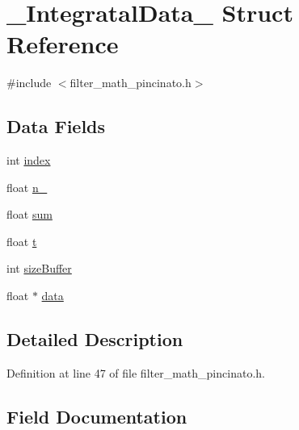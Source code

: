 \hypertarget{struct___integratal_data__}{}\section{\+\_\+\+Integratal\+Data\+\_\+ Struct Reference}
\label{struct___integratal_data__}


{\ttfamily \#include $<$filter\+\_\+math\+\_\+pincinato.\+h$>$}

\subsection*{Data Fields}
\begin{DoxyCompactItemize}
\item 
int \mbox{\hyperlink{struct___integratal_data___a750b5d744c39a06bfb13e6eb010e35d0}{index}}
\item 
float \mbox{\hyperlink{struct___integratal_data___ac3425b2894d221103b85016ba85e4722}{n\+\_}}
\item 
float \mbox{\hyperlink{struct___integratal_data___aeeafe7e9eebbd2a45ce4fa2ae0d96c51}{sum}}
\item 
float \mbox{\hyperlink{struct___integratal_data___afea36502e9d227ff62c5fb2719a246f2}{t}}
\item 
int \mbox{\hyperlink{struct___integratal_data___a145948232f729807d798ee4339711815}{size\+Buffer}}
\item 
float $\ast$ \mbox{\hyperlink{struct___integratal_data___a57ba9c584cf7756552b7d4370e93395f}{data}}
\end{DoxyCompactItemize}


\subsection{Detailed Description}


Definition at line 47 of file filter\+\_\+math\+\_\+pincinato.\+h.



\subsection{Field Documentation}
\mbox{\label{struct___integratal_data___a57ba9c584cf7756552b7d4370e93395f}} 
